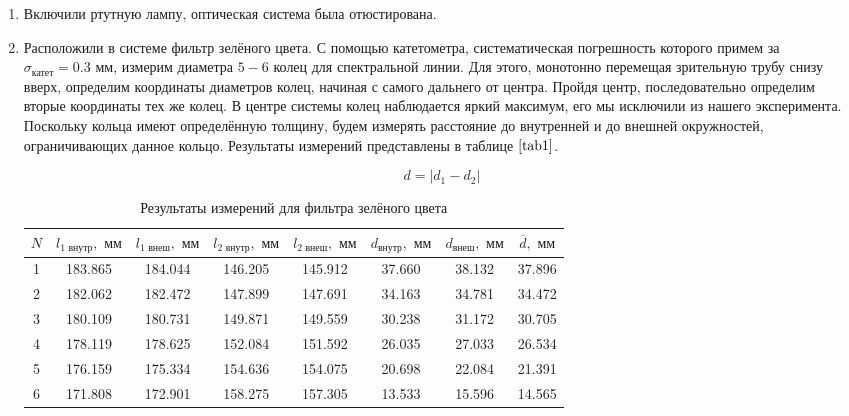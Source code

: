 \documentclass[a4paper,12pt]{article} %
\begin{document}
\begin{enumerate}
    \item Включили ртутную лампу, оптическая система была отюстирована.
    \item Расположили в системе фильтр зелёного цвета. С помощью катетометра, систематическая погрешность которого примем за $\sigma_{\text{катет}} = 0.3 \text{ мм}$, измерим диаметра $5-6$ колец для спектральной линии. Для этого, монотонно перемещая зрительную трубу снизу вверх, определим координаты диаметров колец, начиная с самого дальнего от центра. Пройдя центр, последовательно определим вторые координаты тех же колец. В центре системы колец наблюдается яркий максимум, его мы исключили из нашего эксперимента. Поскольку кольца имеют определённую толщину, будем измерять расстояние до внутренней и до внешней окружностей, ограничивающих данное кольцо. Результаты измерений представлены в таблице $\ref{tab1}$.

    \[ d = \lvert d_1 - d_2\rvert \]

    \begin{table}[h]
        \centering
        \begin{tabular}{|c|c|c|c|c|c|c|c|}
        \hline
    	$N$ & $l_{\text{1 внутр}}, \text{ мм}$ & $l_{\text{1 внеш}}, \text{ мм}$ & $l_{\text{2 внутр}}, \text{ мм}$ & $l_{\text{2 внеш}}, \text{ мм}$ & $d_{\text{внутр}}, \text{ мм}$ & $d_{\text{внеш}}, \text{ мм}$ & $\overline{d}, \text{ мм}$ \\ \hline
    	1 & 183.865 & 184.044 & 146.205 & 145.912 & 37.660 & 38.132 & 37.896 \\ \hline
    	2 & 182.062 & 182.472 & 147.899 & 147.691 & 34.163 & 34.781 & 34.472 \\ \hline
    	3 & 180.109 & 180.731 & 149.871 & 149.559 & 30.238 & 31.172 & 30.705 \\ \hline
    	4 & 178.119 & 178.625 & 152.084 & 151.592 & 26.035 & 27.033 & 26.534 \\ \hline
    	5 & 176.159 & 175.334 & 154.636 & 154.075 & 20.698 & 22.084 & 21.391 \\ \hline
    	6 & 171.808 & 172.901 & 158.275 & 157.305 & 13.533 & 15.596 & 14.565 \\ \hline
        \end{tabular}
    \caption{Результаты измерений для фильтра зелёного цвета}
    \label{tab1}
    \end{table}


\end{enumerate}
\end{document}
